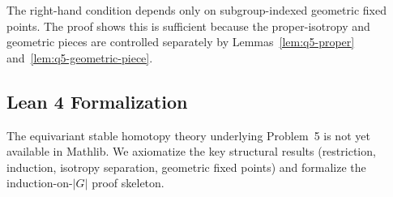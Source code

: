 \begin{remark}
The right-hand condition depends only on subgroup-indexed geometric fixed points. The proof shows this is sufficient because the proper-isotropy and geometric pieces are controlled separately by Lemmas~\ref{lem:q5-proper} and~\ref{lem:q5-geometric-piece}.
\end{remark}

\subsection*{Lean 4 Formalization}

The equivariant stable homotopy theory underlying Problem~5 is not yet
available in Mathlib.  We axiomatize the key structural results
(restriction, induction, isotropy separation, geometric fixed points)
and formalize the induction-on-$|G|$ proof skeleton.

